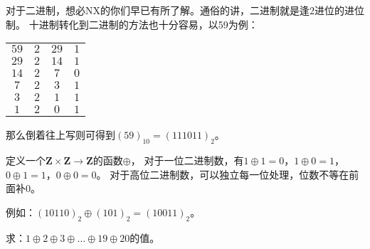 \vspace{6pt}
\par 对于二进制，想必NX的你们早已有所了解。通俗的讲，二进制就是逢2进位的进位制。
十进制转化到二进制的方法也十分容易，以59为例：
\begin{center}
\begin{tabular}{c @{$ \div $} c @{$ = $} c @{$ \ldots $} c}
$59$ & $2$ & $29$ & $1$ \\
$29$ & $2$ & $14$ & $1$ \\
$14$ & $2$ & $7$ & $0$ \\
$7$ & $2$ & $3$ & $1$ \\
$3$ & $2$ & $1$ & $1$ \\
$1$ & $2$ & $0$ & $1$ \\
\end{tabular}
\end{center}
那么倒着往上写则可得到$(59)_{10} = (111011)_{2}$。\par
定义一个$\mathbf{Z} \times \mathbf{Z} \to \mathbf{Z}$的函数$\oplus$，
对于一位二进制数，有$1 \oplus 1 = 0$，$1 \oplus 0 = 1$，$0 \oplus 1 = 1$，$0 \oplus 0 = 0$。
对于高位二进制数，可以独立每一位处理，位数不等在前面补0。\par
例如：$(10110)_2 \oplus (101)_2 = (10011)_2$。
\par 求：$1 \oplus 2 \oplus 3 \oplus \ldots \oplus 19 \oplus 20$的值。
